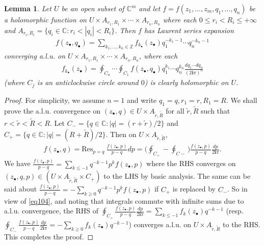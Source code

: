 \documentclass[12pt,a4paper,notitlepage]{article}
\theoremstyle{definition}
\theoremstyle{plain}
\newtheorem{lm}[df]{Lemma}
\newcommand{\wtd}{\widetilde}
\newcommand{\Res}{\mathrm{Res}}
\newcommand{\im}{\mathbf{i}}
\newcommand{\blt}{\bullet}
\newcommand{\Cbb}{\mathbb C}
\newcommand{\Zbb}{\mathbb Z}
\numberwithin{equation}{section}
\begin{document}
\begin{lm}\label{lb76}
Let $U$ be an open subset of $\Cbb^m$ and let $f=f(z_1,\dots,z_m,q_1,\dots,q_n)$ be a holomorphic function on $U\times A_{r_1,R_1}\times\cdots\times A_{r_n,R_n}$ where each $0\leq r_i<R_i\leq+\infty$ and $A_{r_i,R_i}=\{q_i\in\Cbb:r_i<|q_i|<R_i\}$. Then $f$ has Laurent series expansion
	\begin{align}
		f(z_\blt,q_\blt)=\sum_{k_1,\dots,k_n\in\Zbb}f_{k_\blt}(z_\blt)q_1^{-k_1-1}\cdots q_n^{-k_n-1}	
	\end{align}
converging a.l.u. on $U\times A_{r_1,R_1}\times\cdots\times A_{r_n,R_n}$, where each 
\begin{align}
f_{k_\blt}(z_\blt)=\oint_{C_n}\cdots \oint_{C_1}f(z_\blt,q_\blt)q_1^{k_1}\cdots q_n^{k_n}\frac{dq_1\cdots dq_n}	{(2\im\pi)^n}\label{eq104}
\end{align}
(where $C_j$ is an anticlockwise circle around $0$) is clearly holomorphic on $U$.
\end{lm}

\begin{proof}
For simplicity, we assume $n=1$ and write $q_1=q,r_1=r,R_1=R$. We shall prove the a.l.u. convergence on $(z_\blt,q)\in U\times A_{\wtd r,\wtd R}$ for all $\wtd r,\wtd R$ such that $r<\wtd r<\wtd R<R$.  Let $C_-=\{q\in\Cbb:|q|=(r+\wtd r)/2\}$ and $C_+=\{q\in\Cbb:|q|=(R+\wtd R)/2\}$. Then on $U\times A_{\wtd r,\wtd R}$,
\begin{align*}
f(z_\blt,q)=\Res_{p=q}~\frac{f(z_\blt,p)}{p-q}dp=\bigg(\oint_{C_+}-\oint_{C-}\bigg)\frac{f(z_\blt,p)}{p-q}\frac{dp}{2\im\pi}.
\end{align*}
We have $\frac{f(z_\blt,p)}{p-q}=\sum_{k\leq-1}q^{-k-1}p^kf(z_\blt,p)$ where the RHS converges on $(z_\blt,q,p)\in (U\times A_{\wtd r,\wtd R}\times C_+)$ to the LHS by basic analysis. The same can be said about $\frac{f(z_\blt,p)}{p-q}=-\sum_{k\geq0}q^{-k-1}p^kf(z_\blt,p)$ if $C_+$ is replaced by $C_-$. So in view of \eqref{eq104}, and noting that integrals commute with infinite sums due to a.l.u. convergence,  the RHS of $\oint_{C_+}\frac{f(z_\blt,p)}{p-q}\frac{dp}{2\im\pi}=\sum_{k\leq-1}f_k(z_\blt)q^{-k-1}$ (resp. $\oint_{C_-}\frac{f(z_\blt,p)}{p-q}\frac{dp}{2\im\pi}=-\sum_{k\geq0}f_k(z_\blt)q^{-k-1}$) converges a.l.u. on $U\times A_{\wtd r,\wtd R}$ to the RHS. This completes the proof.
\end{proof}



\subsection{}\label{lb72}
\end{document}
